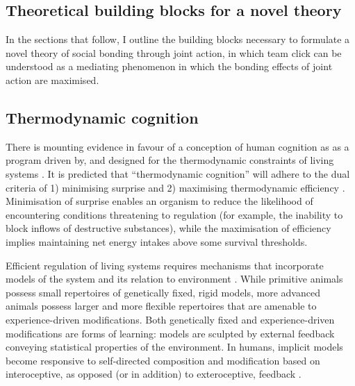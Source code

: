 \begin{CJK}{UTF8}{gbsn}
\section{Theoretical building blocks for a novel theory}


In the sections that follow, I outline the building blocks necessary to formulate a novel theory of social bonding through joint action, in which team click can be understood as a mediating phenomenon in which the bonding effects of joint action are maximised.

\subsection{Thermodynamic cognition}
There is mounting evidence in favour of a conception of human cognition as as a program driven by, and designed for the thermodynamic constraints of living systems \citep{Yufik2017}.  It is predicted that ``thermodynamic cognition'' will adhere to the dual criteria of 1) minimising surprise \citep{Friston2010,Sengupta2013,Sengupta2016,Sengupta2017} and 2) maximising thermodynamic efficiency \citep{Yufik2002,Yufik2013}.   Minimisation of surprise enables an organism to reduce the likelihood of encountering conditions threatening to regulation (for example, the inability to block inflows of destructive substances), while the maximisation of efficiency implies maintaining net energy intakes above some survival thresholds.

Efficient regulation of living systems requires mechanisms that incorporate models of the system and its relation to environment \citep{Conant1970}.  While primitive animals possess small repertoires of genetically fixed, rigid models, more advanced animals possess larger and more flexible repertoires that are amenable to experience-driven modifications.  Both genetically fixed and experience-driven modifications are forms of learning: models are sculpted by external feedback conveying statistical properties of the environment.  In humans, implicit models become responsive to self-directed composition and modification based on interoceptive, as opposed (or in addition) to exteroceptive, feedback \citep{Yufik1998}.


\end{CJK}
